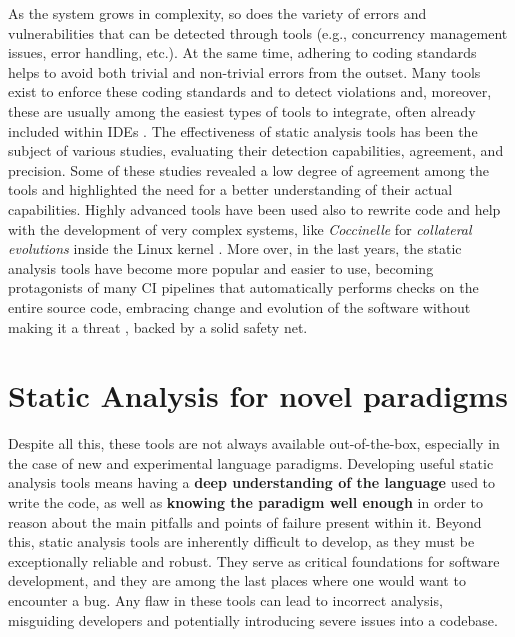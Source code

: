 \documentclass[12pt,a4paper,openright,twoside]{book}
\begin{document}
As the system grows in complexity, so does the variety of errors and
vulnerabilities that can be detected through tools (e.g., concurrency management
issues, error handling, etc.). At the same time, adhering to coding standards
helps to avoid both trivial and non-trivial errors from the outset.
Many tools exist to enforce these coding standards and to detect violations and,
moreover, these are usually among the easiest types of tools to integrate, often
already included within \acp{IDE} \cite{DBLP:journals/queue/Thomson21}.
%
The effectiveness of static analysis tools has been the subject of various
studies,  \cite{DBLP:journals/jss/LenarduzziPSLP23} evaluating their detection
capabilities, agreement, and precision. Some of these studies revealed a low
degree of agreement among the tools and highlighted the need for a better
understanding of their actual capabilities. Highly advanced tools have been used
also to rewrite code and help with the development of very complex systems, like
\emph{Coccinelle} for \emph{collateral evolutions} inside the Linux kernel
\cite{DBLP:conf/eurosys/PadioleauLHM08}\cite{DBLP:conf/usenix/LawallM18}.
%
More over, in the last years, the static analysis tools have become more popular
and easier to use, becoming protagonists of many \ac{CI} pipelines
\cite{DBLP:conf/msr/ZampettiSOCP17} that automatically performs checks on the
entire source code, embracing change and evolution of the software without
making it a threat \cite{DBLP:books/daglib/0015650}, backed by a solid safety
net. 

\section{Static Analysis for novel paradigms}

Despite all this, these tools are not always available out-of-the-box,
especially in the case of new and experimental language paradigms. Developing
useful static analysis tools means having a \textbf{deep understanding of the
language} used to write the code, as well as \textbf{knowing the paradigm well
enough} in order to reason about the main pitfalls and points of failure present
within it.
%
Beyond this, static analysis tools are inherently difficult to develop, as they
must be exceptionally reliable and robust. They serve as critical foundations
for software development, and they are among the last places where one would
want to encounter a bug. Any flaw in these tools can lead to incorrect analysis,
misguiding developers and potentially introducing severe issues into a codebase.
\end{document}
